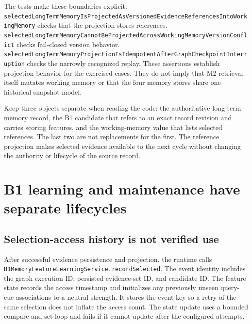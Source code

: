 The tests make these boundaries explicit. \texttt{selected\allowbreak{}Long\allowbreak{}Term\allowbreak{}Memory\allowbreak{}Is\allowbreak{}Projected\allowbreak{}As\allowbreak{}Versioned\allowbreak{}Evidence\allowbreak{}References\allowbreak{}Into\allowbreak{}Working\allowbreak{}Memory} checks that the projection stores references. \texttt{selected\allowbreak{}Long\allowbreak{}Term\allowbreak{}Memory\allowbreak{}Cannot\allowbreak{}Be\allowbreak{}Projected\allowbreak{}Across\allowbreak{}Working\allowbreak{}Memory\allowbreak{}Version\allowbreak{}Conflict} checks fail-closed version behavior. \texttt{selected\allowbreak{}Long\allowbreak{}Term\allowbreak{}Memory\allowbreak{}Projection\allowbreak{}Is\allowbreak{}Idempotent\allowbreak{}After\allowbreak{}Graph\allowbreak{}Checkpoint\allowbreak{}Interruption} checks the narrowly recognized replay. These assertions establish projection behavior for the exercised cases. They do not imply that M2 retrieval itself mutates working memory or that the four memory stores share one historical snapshot model.

\begin{tipbox}
Keep three objects separate when reading the code: the authoritative long-term memory record, the B1 candidate that refers to an exact record revision and carries scoring features, and the working-memory value that lists selected references. The last two are not replacements for the first. The reference projection makes selected evidence available to the next cycle without changing the authority or lifecycle of the source record.
\end{tipbox}

\section{B1 learning and maintenance have separate lifecycles}
\label{sec:ch21-b1-learning}

\subsection{Selection-access history is not verified use}
\label{subsec:ch21-b1-access}

After successful evidence persistence and projection, the runtime calls \texttt{B1\allowbreak{}Memory\allowbreak{}Feature\allowbreak{}Learning\allowbreak{}Service.\allowbreak{}record\allowbreak{}Selected}. The event identity includes the graph execution ID, persisted evidence-set ID, and candidate ID. The feature state records the access timestamp and initializes any previously unseen query-cue associations to a neutral strength. It stores the event key so a retry of the same selection does not inflate the access count. The state update uses a bounded compare-and-set loop and fails if it cannot update after the configured attempts.

